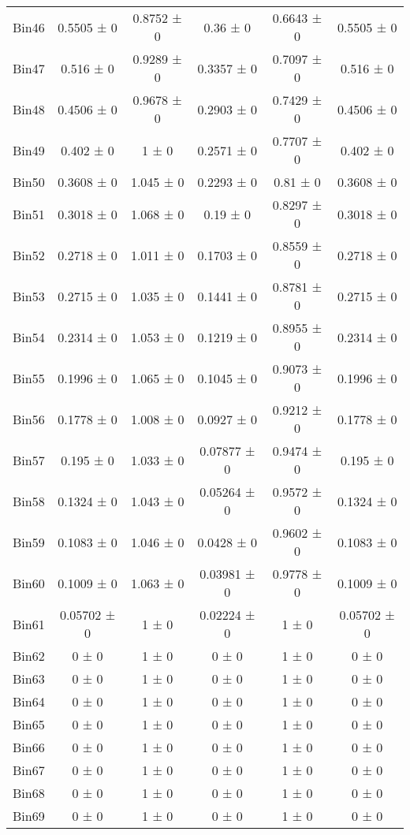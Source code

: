 \begin{tabular}{@{\extracolsep{4pt}}lccccc@{}}
     Bin46 & 0.5505 ± 0 & 0.8752 ± 0 & 0.36 ± 0 & 0.6643 ± 0 & 0.5505 ± 0 \\ 
     Bin47 & 0.516 ± 0 & 0.9289 ± 0 & 0.3357 ± 0 & 0.7097 ± 0 & 0.516 ± 0 \\ 
     Bin48 & 0.4506 ± 0 & 0.9678 ± 0 & 0.2903 ± 0 & 0.7429 ± 0 & 0.4506 ± 0 \\ 
     Bin49 & 0.402 ± 0 & 1 ± 0 & 0.2571 ± 0 & 0.7707 ± 0 & 0.402 ± 0 \\ 
     Bin50 & 0.3608 ± 0 & 1.045 ± 0 & 0.2293 ± 0 & 0.81 ± 0 & 0.3608 ± 0 \\ 
     Bin51 & 0.3018 ± 0 & 1.068 ± 0 & 0.19 ± 0 & 0.8297 ± 0 & 0.3018 ± 0 \\ 
     Bin52 & 0.2718 ± 0 & 1.011 ± 0 & 0.1703 ± 0 & 0.8559 ± 0 & 0.2718 ± 0 \\ 
     Bin53 & 0.2715 ± 0 & 1.035 ± 0 & 0.1441 ± 0 & 0.8781 ± 0 & 0.2715 ± 0 \\ 
     Bin54 & 0.2314 ± 0 & 1.053 ± 0 & 0.1219 ± 0 & 0.8955 ± 0 & 0.2314 ± 0 \\ 
     Bin55 & 0.1996 ± 0 & 1.065 ± 0 & 0.1045 ± 0 & 0.9073 ± 0 & 0.1996 ± 0 \\ 
     Bin56 & 0.1778 ± 0 & 1.008 ± 0 & 0.0927 ± 0 & 0.9212 ± 0 & 0.1778 ± 0 \\ 
     Bin57 & 0.195 ± 0 & 1.033 ± 0 & 0.07877 ± 0 & 0.9474 ± 0 & 0.195 ± 0 \\ 
     Bin58 & 0.1324 ± 0 & 1.043 ± 0 & 0.05264 ± 0 & 0.9572 ± 0 & 0.1324 ± 0 \\ 
     Bin59 & 0.1083 ± 0 & 1.046 ± 0 & 0.0428 ± 0 & 0.9602 ± 0 & 0.1083 ± 0 \\ 
     Bin60 & 0.1009 ± 0 & 1.063 ± 0 & 0.03981 ± 0 & 0.9778 ± 0 & 0.1009 ± 0 \\ 
     Bin61 & 0.05702 ± 0 & 1 ± 0 & 0.02224 ± 0 & 1 ± 0 & 0.05702 ± 0 \\ 
     Bin62 & 0 ± 0 & 1 ± 0 & 0 ± 0 & 1 ± 0 & 0 ± 0 \\ 
     Bin63 & 0 ± 0 & 1 ± 0 & 0 ± 0 & 1 ± 0 & 0 ± 0 \\ 
     Bin64 & 0 ± 0 & 1 ± 0 & 0 ± 0 & 1 ± 0 & 0 ± 0 \\ 
     Bin65 & 0 ± 0 & 1 ± 0 & 0 ± 0 & 1 ± 0 & 0 ± 0 \\ 
     Bin66 & 0 ± 0 & 1 ± 0 & 0 ± 0 & 1 ± 0 & 0 ± 0 \\ 
     Bin67 & 0 ± 0 & 1 ± 0 & 0 ± 0 & 1 ± 0 & 0 ± 0 \\ 
     Bin68 & 0 ± 0 & 1 ± 0 & 0 ± 0 & 1 ± 0 & 0 ± 0 \\ 
     Bin69 & 0 ± 0 & 1 ± 0 & 0 ± 0 & 1 ± 0 & 0 ± 0 \\ 

\end{tabular}
